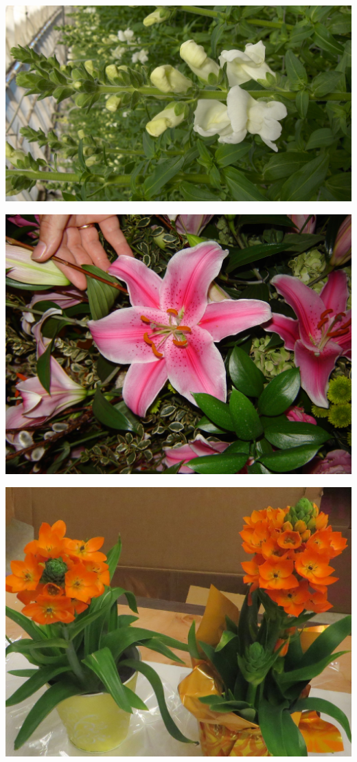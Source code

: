 \documentclass{article}
\begin{document}
\begin{center}
\includegraphics[height=0.925\paperheight]{../Snapdragon.jpg}
\end{center}
\newpage

\begin{center}
\includegraphics[height=0.925\paperheight]{../Stargazer_(OrientalLily).jpg}
\end{center}
\newpage

\begin{center}
\includegraphics[height=0.925\paperheight]{../StarOfBethlehem.jpg}
\end{center}
\newpage
\end{document}
